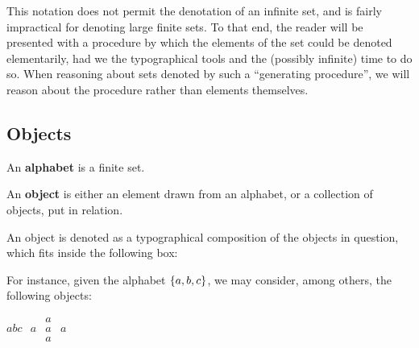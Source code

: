 This notation does not permit the denotation of an infinite set, and is fairly
impractical for denoting large finite sets. To that end, the reader will be
presented with a procedure by which the elements of the set could be denoted
elementarily, had we the typographical tools and the (possibly infinite) time
to do so. When reasoning about sets denoted by such a ``generating procedure'',
we will reason about the procedure rather than elements themselves.

\subsection{Objects}

\begin{definition}

An \textbf{alphabet} is a finite set.

\end{definition}

\begin{definition}

An \textbf{object} is either an element drawn from an alphabet, or a collection
of objects, put in relation.

\end{definition}

\begin{notation}

An object is denoted as a typographical composition of the objects in question,
which fits inside the following box:

\begin{center}
\end{center}

\end{notation}

For instance, given the alphabet $\left\{{a,b,c}\right\}$, we may consider, among
others, the following objects:

\begin{center}
$abc$
\quad\quad\quad
$\begin{matrix}
  & a &   \\
a & a & a \\
  & a &
\end{matrix}$
\quad\quad\quad
{}

\end{center}

